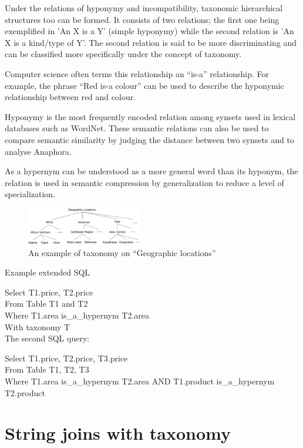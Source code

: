 \documentclass{sig-alternate}
\begin{document}
Under the relations of hyponymy and incompatibility, taxonomic hierarchical structures too can be formed. It consists of two relations; the first one being exemplified in 'An X is a Y' (simple hyponymy) while the second relation is 'An X is a kind/type of Y'. The second relation is said to be more discriminating and can be classified more specifically under the concept of taxonomy.

Computer science often terms this relationship an ``is-a'' relationship. For example, the phrase ``Red is-a colour'' can be used to describe the hyponymic relationship between red and colour.

Hyponymy is the most frequently encoded relation among synsets used in lexical databases such as WordNet. These semantic relations can also be used to compare semantic similarity by judging the distance between two synsets and to analyse Anaphora.

As a hypernym can be understood as a more general word than its hyponym, the relation is used in semantic compression by generalization to reduce a level of specialization.

\begin{figure}[t]
\centering
\includegraphics[width=0.45\textwidth]{figures/taxonomy}
 \caption{An example of taxonomy on ``\textsf{Geographic locations}''}
\label{fig:taxonomy}
\end{figure}

Example extended SQL

Select  T1.price, T2.price \\
From Table T1 and T2 \\
Where T1.area is\_a\_hypernym T2.area \\
With taxonomy T \\


The second SQL query:

Select  T1.price, T2.price, T3.price \\
From Table T1, T2, T3 \\
Where T1.area is\_a\_hypernym T2.area AND T1.product is\_a\_hypernym T2.product



\section{String joins with taxonomy}
\end{document}
